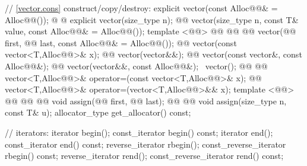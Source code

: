 \documentclass[american,twoside]{book}
\begin{document}
\begin{codeblock}
{{    // \ref{vector.cons} construct/copy/destroy:
    explicit vector(const Alloc@@& = Alloc@@());
    @ @ 
      explicit vector(size_type n);
    @@ 
      vector(size_type n, const T& value, const Alloc@@& = Alloc@@());
    template <@@>
      @@ @@
            @@
      vector(@@ first, @@ last,
             const Alloc@@& = Alloc@@());
    @@ vector(const vector<T,Alloc@@>& x);
    @@ vector(vector&&);
    @@ vector(const vector&, const Alloc@@&);
    @@ vector(vector&&, const Alloc@@&);
   ~vector();
    @@ @@
      vector<T,Alloc@@>& operator=(const vector<T,Alloc@@>& x);
    @@
      vector<T,Alloc@@>& operator=(vector<T,Alloc@@>&& x);
    template <@@>
      @@
            @@
            @@
      void assign(@@ first, @@ last);
    @@ @@
      void assign(size_type n, const T& u);
    allocator_type get_allocator() const;

    // iterators:
    iterator               begin();
    const_iterator         begin() const;
    iterator               end();
    const_iterator         end() const;
    reverse_iterator       rbegin();
    const_reverse_iterator rbegin() const;
    reverse_iterator       rend();
    const_reverse_iterator rend() const;

}}
\end{codeblock}
\end{document}
